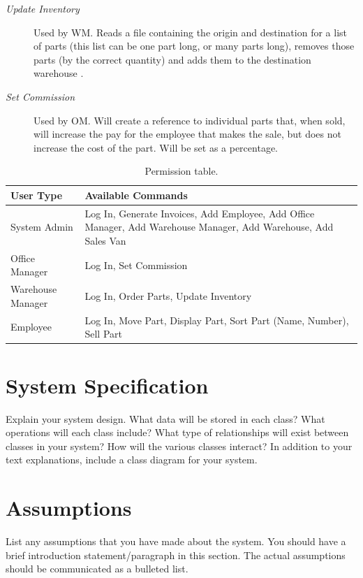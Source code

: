 \documentclass{report}
\begin{document}
\begin{description}
  \item [\textit{Update Inventory}] Used by WM. Reads a file containing the origin and destination for a list of parts (this list can be one part long, or many parts long), removes those parts (by the correct quantity) and adds them to the destination warehouse .
  \item [\textit{Set Commission}] Used by OM. Will create a reference to individual parts that, when sold, will increase the pay for the employee that makes the sale, but does not increase the cost of the part. Will be set as a percentage.
\end{description}

\begin{table}[htb]
  \begin{center}
      \begin{tabular}{ | l | p{8cm} |}
      \hline
      User Type & Available Commands \\ \hline
      System Admin & Log In, Generate Invoices, Add Employee, Add Office Manager, Add Warehouse Manager, Add Warehouse, Add Sales Van \\ \hline
      Office Manager & Log In, Set Commission\\ \hline
      Warehouse Manager & Log In, Order Parts, Update Inventory \\ \hline
      Employee & Log In, Move Part, Display Part, Sort Part (Name, Number), Sell Part \\
      \hline
      \end{tabular}
  \end{center}
  \caption{Permission table.}
\end{table}

\section{System Specification}

Explain your system design. What data will be stored in each class?  What operations will each class include?  What type of relationships will exist between classes in your system? How will the various classes interact? In addition to your text explanations, include a class diagram for your system.\par

\section{Assumptions}

List any assumptions that you have made about the system. You should have a brief introduction statement/paragraph in this section. The actual assumptions should be communicated as a bulleted list.\par
\end{document}
